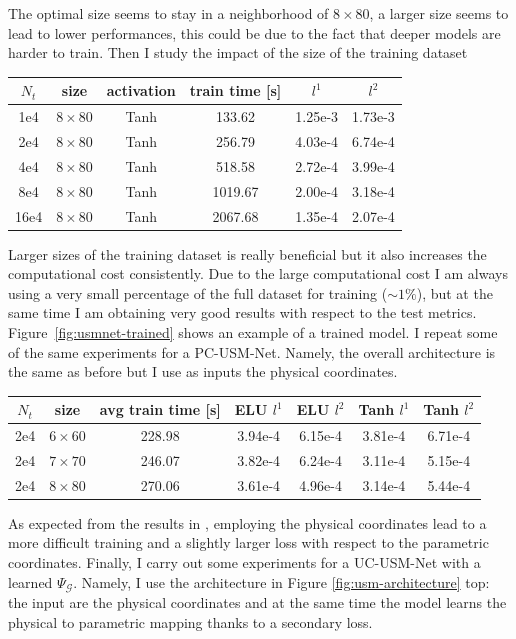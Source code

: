 \documentclass[11pt]{article}
\begin{document}
The optimal size seems to stay in a neighborhood of $8\times 80$, a larger size seems to lead to lower performances, this could be due to the fact that deeper models are harder to train. Then I study the impact of the size of the training dataset
\begin{center}
\begin{tabular}{ c|c|c|c|c|c } 
 $N_t$ & size & activation & train time [s] & $l^1$ & $l^2$ \\ 
 \hline
 1e4 & $8\times 80$ & Tanh & 133.62 &  1.25e-3 & 1.73e-3\\
 2e4 & $8\times 80$ & Tanh & 256.79 &  4.03e-4 & 6.74e-4\\
 4e4 & $8\times 80$ & Tanh & 518.58 &  2.72e-4 & 3.99e-4\\
 8e4 & $8\times 80$ & Tanh & 1019.67 &  2.00e-4 & 3.18e-4\\
 16e4 & $8\times 80$ & Tanh & 2067.68 &  1.35e-4 & 2.07e-4\\
\end{tabular}
\end{center}
Larger sizes of the training dataset is really beneficial but it also increases the computational cost consistently. Due to the large computational cost I am always using a very small percentage of the full dataset for training ($\sim 1\%$), but at the same time I am obtaining very good results with respect to the test metrics. Figure~\ref{fig:usmnet-trained} shows an example of a trained model. I repeat some of the same experiments for a PC-USM-Net. Namely, the overall architecture is the same as before but I use as inputs the physical coordinates.

\begin{center}
\begin{tabular}{ c|c|c|c|c|c|c } 
 $N_t$ & size & avg train time [s] & ELU $l^1$ & ELU $l^2$ & Tanh $l^1$ & Tanh $l^2$ \\ 
 \hline
 2e4 & $6\times 60$ & 228.98 & 3.94e-4 & 6.15e-4 & 3.81e-4 & 6.71e-4\\
 2e4 & $7\times 70$ & 246.07 & 3.82e-4 & 6.24e-4 & 3.11e-4 & 5.15e-4\\
 2e4 & $8\times 80$ & 270.06 & 3.61e-4 & 4.96e-4 & 3.14e-4 & 5.44e-4\\
\end{tabular}
\end{center}

As expected from the results in \cite{regazzoni2022}, employing the physical coordinates lead to a more difficult training and a slightly larger loss with respect to the parametric coordinates. Finally, I carry out some experiments for a UC-USM-Net with a learned $\Psi_{\mathcal G}$. Namely, I use the architecture in Figure \ref{fig:usm-architecture} top: the input are the physical coordinates and at the same time the model learns the physical to parametric mapping thanks to a secondary loss.
\end{document}
